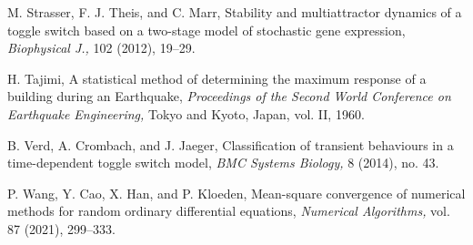 \documentclass[reqno,12pt]{amsart}
\theoremstyle{plain} %
\theoremstyle{definition} %
\begin{document}
\begin{thebibliography}{25}
     M. Strasser, F. J. Theis, and C. Marr, Stability and multiattractor dynamics of a toggle switch based on a two-stage model of stochastic gene expression, \emph{Biophysical J.,} 102 (2012), 19--29.

     H. Tajimi, A statistical method of determining the maximum response of a building during an Earthquake, \emph{Proceedings of the Second World Conference on Earthquake Engineering,} Tokyo and Kyoto, Japan, vol. II, 1960.
    
     B. Verd, A. Crombach, and J. Jaeger, Classification of transient behaviours in a time-dependent toggle switch model, \emph{BMC Systems Biology,} 8 (2014), no. 43.

     P. Wang, Y. Cao, X. Han, and P. Kloeden, Mean-square convergence of numerical methods for random ordinary differential equations, \emph{Numerical Algorithms,} vol. 87 (2021), 299--333.

\end{thebibliography}
\end{document}
